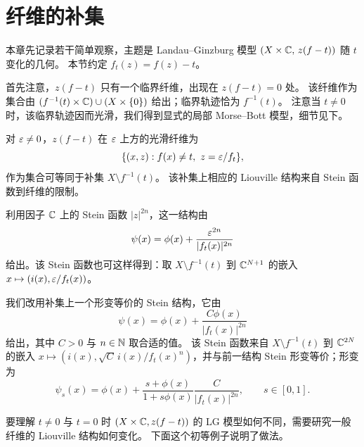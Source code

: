 \section{纤维的补集}

本章先记录若干简单观察，主题是 Landau--Ginzburg 模型 $(X\times\mathbb{C},\,z(f-t))$ 随 $t$ 变化的几何。
本节约定 $f_t(z)=f(z)-t$。

首先注意，$z(f-t)$ 只有一个临界纤维，出现在 $z(f-t)=0$ 处。
该纤维作为集合由 $(f^{-1}(t)\times\mathbb{C})\cup(X\times\{0\})$ 给出；临界轨迹恰为 $f^{-1}(t)$。
注意当 $t\ne0$ 时，该临界轨迹因而光滑，我们得到显式的局部 Morse--Bott 模型，细节见下。

对 $\varepsilon\ne0$，$z(f-t)$ 在 $\varepsilon$ 上方的光滑纤维为
\[
  \{(x,z): f(x)\ne t,\ z=\varepsilon/f_t\},
\]
作为集合可等同于补集 $X\setminus f^{-1}(t)$。
该补集上相应的 Liouville 结构来自 Stein 函数到纤维的限制。


利用因子 $\mathbb{C}$ 上的 Stein 函数 $|z|^{2n}$，这一结构由
\[
  \psi(x)=\phi(x)+\frac{\varepsilon^{2n}}{|f_t(x)|^{2n}}
\]
给出。该 Stein 函数也可这样得到：取 $X\setminus f^{-1}(t)$ 到 $\mathbb{C}^{N+1}$ 的嵌入
$x\mapsto(i(x),\varepsilon/f_t(x))$。


我们改用补集上一个形变等价的 Stein 结构，它由
\[
  \psi(x)=\phi(x)+\frac{C\phi(x)}{|f_t(x)|^{2n}}
\]
给出，其中 $C>0$ 与 $n\in\mathbb{N}$ 取合适的值。
该 Stein 函数来自 $X\setminus f^{-1}(t)$ 到 $\mathbb{C}^{2N}$ 的嵌入
$x\mapsto(i(x),\sqrt{C}\,i(x)/f_t(x)^n)$，并与前一结构 Stein 形变等价；形变为
\[
  \psi_s(x)=\phi(x)+\frac{s+\phi(x)}{1+s\phi(x)}\frac{C}{|f_t(x)|^{2n}},
  \qquad s\in[0,1].
\]


要理解 $t\ne0$ 与 $t=0$ 时 $(X\times\mathbb{C},z(f-t))$ 的 LG 模型如何不同，需要研究一般纤维的 Liouville 结构如何变化。
下面这个初等例子说明了做法。


